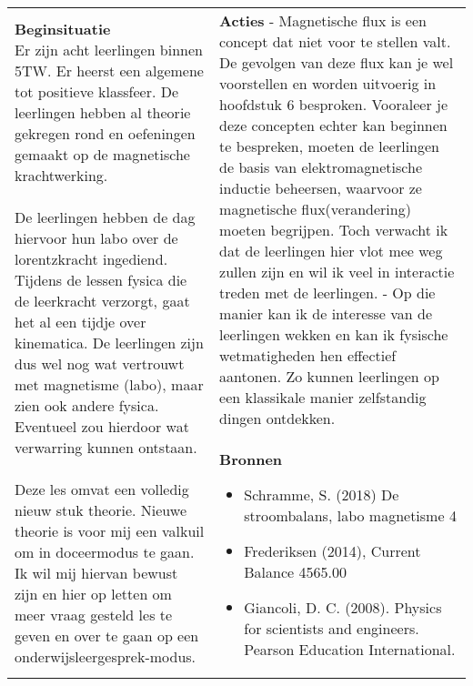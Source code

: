 \begin{landscape}
	\begin{tabularx}{1.56\textwidth}{|p{}|X|}
		\hline
		\multirow{2}{0.55\textwidth}{\textbf{Beginsituatie}\newline  
		Er zijn acht leerlingen binnen 5TW. Er heerst een algemene tot positieve klassfeer. De leerlingen hebben al theorie gekregen  rond en oefeningen gemaakt op de magnetische krachtwerking. \newline\newline De leerlingen hebben de dag hiervoor hun labo over de lorentzkracht ingediend. Tijdens de lessen fysica die de leerkracht verzorgt, gaat het al een tijdje over kinematica. De leerlingen zijn dus wel nog wat vertrouwt met magnetisme (labo), maar zien ook andere fysica. Eventueel zou hierdoor wat verwarring kunnen ontstaan. \newline\newline Deze les omvat een volledig nieuw stuk theorie. Nieuwe theorie is voor mij een valkuil om in doceermodus te gaan. Ik wil mij hiervan bewust zijn en hier op letten om meer vraag gesteld les te geven en over te gaan op een onderwijsleergesprek-modus.} & \textbf{Acties}\newline\newline  
		- Magnetische flux is een concept dat niet voor te stellen valt. De gevolgen van deze flux kan je wel voorstellen en worden uitvoerig in hoofdstuk 6 besproken. Vooraleer je deze concepten echter kan beginnen te bespreken, moeten de leerlingen de basis van elektromagnetische inductie beheersen, waarvoor ze magnetische flux(verandering) moeten begrijpen. Toch verwacht ik dat de leerlingen hier vlot mee weg zullen zijn en wil ik veel in interactie treden met de leerlingen. \newline\newline
		- \GreenHighlight{Via demo's wil ik bepaalde onderwerpen starten.}{9cm}	Op die manier kan ik de interesse van de leerlingen wekken en kan ik fysische wetmatigheden hen effectief aantonen. Zo kunnen leerlingen op een klassikale manier zelfstandig dingen ontdekken.	
		\newline\newline\newline\newline
		
		\\ \cline{2-2}
		  & \textbf{Bronnen}\begin{itemize}
		  	\item Schramme, S. (2018) De stroombalans, labo magnetisme 4
		  	\item Frederiksen (2014), Current Balance 4565.00
		  	\item Giancoli, D. C. (2008). Physics for scientists and engineers. Pearson Education International.
		  \end{itemize}\\ \hline
	\end{tabularx}



\end{landscape}

